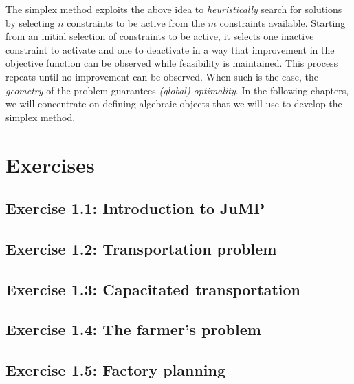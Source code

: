 The simplex method exploits the above idea to \emph{heuristically} search for solutions by selecting $n$ constraints to be active from the $m$ constraints available. Starting from an initial selection of constraints to be active, it selects one inactive constraint to activate and one to deactivate in a way that improvement in the objective function can be observed while feasibility is maintained. This process repeats until no improvement can be observed. When such is the case, the \emph{geometry} of the problem guarantees \emph{(global) optimality}. In the following chapters, we will concentrate on defining algebraic objects that we will use to develop the simplex method.


\vfill
\pagebreak

\section{Exercises}

\subsection*{Exercise 1.1: Introduction to JuMP}


\subsection*{Exercise 1.2: Transportation problem}


\subsection*{Exercise 1.3: Capacitated transportation}


\subsection*{Exercise 1.4: The farmer's problem}


\vfill
\pagebreak
\subsection*{Exercise 1.5: Factory planning}





